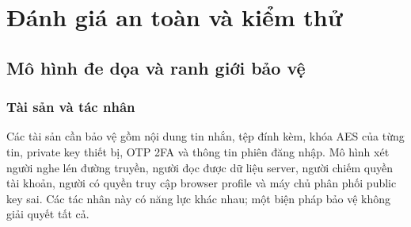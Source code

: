 \chapter{Đánh giá an toàn và kiểm thử}
\section{Mô hình đe dọa và ranh giới bảo vệ}
\subsection{Tài sản và tác nhân}
Các tài sản cần bảo vệ gồm nội dung tin nhắn, tệp đính kèm, khóa AES của từng tin, private key thiết bị, OTP 2FA và thông tin phiên đăng nhập. Mô hình xét người nghe lén đường truyền, người đọc được dữ liệu server, người chiếm quyền tài khoản, người có quyền truy cập browser profile và máy chủ phân phối public key sai. Các tác nhân này có năng lực khác nhau; một biện pháp bảo vệ không giải quyết tất cả.

